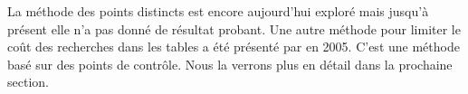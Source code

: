 
		La méthode des points distincts est encore aujourd'hui exploré mais jusqu'à présent elle n'a pas donné de résultat probant. Une autre méthode pour limiter le coût des recherches dans les tables a été présenté par \cite{checkpoints} en 2005. C'est une méthode basé sur des points de contrôle. Nous la verrons plus en détail dans la prochaine section.

\endinput{}

